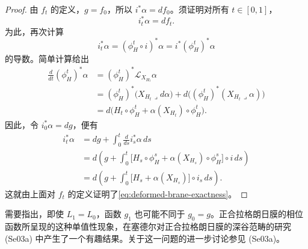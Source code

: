\begin{proof}
由 $f_t$ 的定义，$g=f_0$，所以 $i^*\alpha=df_0$。须证明对所有 $t\in[0,1]$，
\begin{equation}
 i_t^*\alpha=df_t.
 \label{eq:deformed-brane-exactness}
\end{equation}
为此，再次计算
\[
 i_t^*\alpha=(\phi_H^t\circ i)^*\alpha=i^*(\phi_H^t)^*\alpha
\]
的导数。简单计算给出
\begin{equation}
\begin{aligned}
 \frac d{dt}(\phi_H^t)^*\alpha
 &=(\phi_H^t)^*\mathcal L_{X_{H_t}}\alpha\\
 &=(\phi_H^t)^*\bigl(X_{H_t}\mathbin{\lrcorner}d\alpha\bigr)
   +d\bigl((\phi_H^t)^*(X_{H_t}\mathbin{\lrcorner}\alpha)\bigr)\\
 &=d\bigl(H_t\circ\phi_H^t+\alpha(X_{H_t})\circ\phi_H^t\bigr).
\end{aligned}
\label{eq:liouville-form-under-hamiltonian-flow}
\end{equation}
因此，令 $i_0^*\alpha=dg$，便有
\[
\begin{aligned}
 i_t^*\alpha
 &=dg+\int_0^t\frac d{ds}i_s^*\alpha\,ds\\
 &=d\left(g+\int_0^t
   \bigl[H_s\circ\phi_H^s+\alpha(X_{H_s})\circ\phi_H^s\bigr]\circ i\,ds\right)\\
 &=d\left(g+\int_0^t\bigl[H_s+\alpha(X_{H_s})\bigr]\circ i_s\,ds\right).
\end{aligned}
\]
这就由上面对 $f_t$ 的定义证明了\eqref{eq:deformed-brane-exactness}。
\end{proof}

\begin{remark}\label{rem:brane-phase-monodromy}
需要指出，即使 $L_1=L_0$，函数 $g_1$ 也可能不同于 $g_0=g$。正合拉格朗日膜的相位函数所呈现的这种单值性现象，在塞德尔对正合拉格朗日膜的深谷范畴的研究 (Se03a) 中产生了一个有趣结果。关于这一问题的进一步讨论参见 (Se03a)。
\end{remark}
